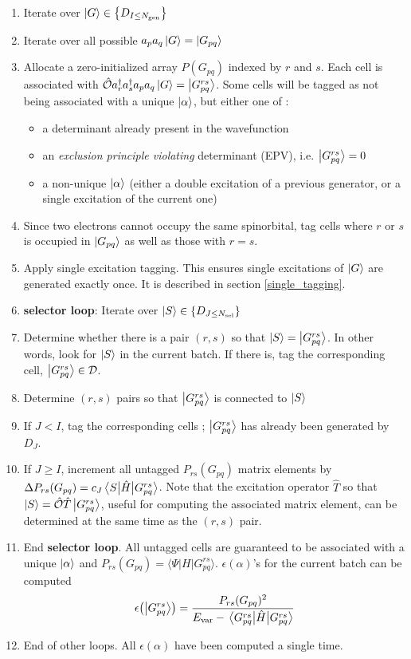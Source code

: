 \documentclass[./thesis.tex]{subfiles}
\begin{document}
\begin{enumerate}
\item
Iterate over $\ket {G} \in \left \{ D_{I \leq {N_\text{gen}}} \right \}$
\item
Iterate over all possible $a_p a_q \ket G = \ket {G_{pq}}$
\item
Allocate a zero-initialized array $P(G_{pq})$ indexed by $r$ and $s$. Each cell is associated with ${\hat{\mathcal{O}}} a^\dagger_r a^\dagger_s a_p a_q  \ket G = \ket{G^{rs}_{pq}}$. Some cells will be tagged as not being associated with a unique $\ket \alpha$, but either one of :
\begin{itemize}
\item
a determinant already present in the wavefunction
\item
an \emph{exclusion principle violating} determinant (EPV), i.e. $\ket{G^{rs}_{pq}} = 0$
\item
a non-unique $\ket \alpha$ (either a double excitation of a previous generator, or a single excitation of the current one)
\end{itemize}

\item
Since two electrons cannot occupy the same spinorbital, tag cells where $r$ or $s$ is occupied in $\ket {G_{pq}}$ as well as those with $r=s$.
\item
Apply single excitation tagging. This ensures single excitations of $\ket G$ are generated exactly once. It is described in section \ref{single_tagging}.
\item
\textbf{selector loop}: Iterate over $\ket {S} \in \left \{ D_{J \le {N_\text{sel}}} \right \}$
\item
Determine whether there is a pair $(r,s)$ so that $\ket S = \ket {G_{pq}^{rs}}$. In other words, look for $\ket S$ in the current batch. If there is, tag the corresponding cell, $\ket{G^{rs}_{pq}} \in \mathcal{D}$.
\item
Determine $(r,s)$ pairs so that $\ket {G_{pq}^{rs}}$ is connected to $\ket S$
\item
If $J<I$, tag the corresponding cells ; $\ket{G^{rs}_{pq}}$ has already been generated by $D_J$.
\item
If $J \geq I$, increment all untagged $P_{rs}(G_{pq})$ matrix elements by $\Delta P_{rs}(G_{pq}) = c_J \mel{S}{\hat{H}}{G^{rs}_{pq}}$. Note that the excitation operator $\hat{T}$ so that $\ket S={\hat{\mathcal{O}}} \hat{T} \ket{G^{rs}_{pq}}$, useful for computing the associated matrix element, can be determined at the same time as the $(r,s)$ pair.
\item
End \textbf{selector loop}. All untagged cells are guaranteed to be associated with a unique $\ket \alpha$ and $P_{rs}(G_{pq}) = \langle \Psi |H|G^{rs}_{pq} \rangle$. $\epsilon(\alpha)$'s for the current batch can be computed  \\

\begin{equation}
\epsilon \qty(\ket {G_{pq}^{rs}}) = \frac{P_{rs}(G_{pq})^2}{E_\text{var}-\mel{G_{pq}^{rs}}{\hat{H}}{G_{pq}^{rs}}}
\end{equation}
\item
End of other loops. All $\epsilon(\alpha)$ have been computed a single time.

\end{enumerate}
\end{document}
